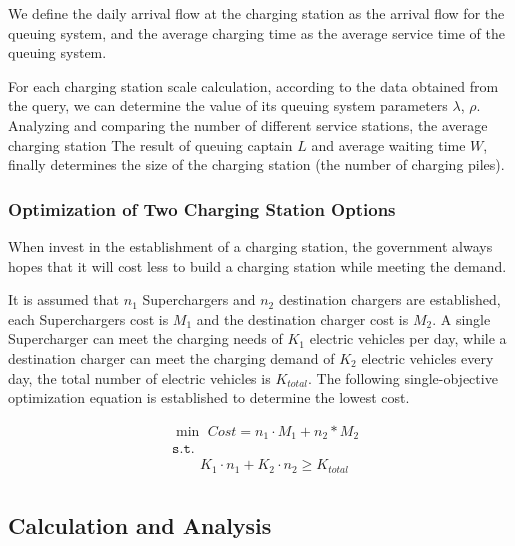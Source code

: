 \documentclass{mcmthesis}
\begin{document}
\par We define the daily arrival flow at the charging station as the arrival flow for the queuing system, and the average charging time as the average service time of the queuing system.

\par For each charging station scale calculation, according to the data obtained from the query, we can determine the value of its queuing system parameters $ \lambda $, $ \rho $. Analyzing and comparing the number of different service stations, the average charging station The result of queuing captain $ L $ and average waiting time $ W $, finally determines the size of the charging station (the number of charging piles).

\subsubsection{Optimization of Two Charging Station Options}


\par When invest in the establishment of a charging station, the government always hopes that it will cost less to build a charging station while meeting the demand. 

\par It is assumed that $n_1$ Superchargers and $n_2$ destination chargers are established, each Superchargers cost is $M_1$ and the destination charger cost is $M_2$. A single Supercharger can meet the charging needs of $K_1$ electric vehicles per day, while a destination charger can meet the charging demand of $K_2$ electric vehicles every day, the total number of electric vehicles is $K_{total}$. The following single-objective optimization equation is established to determine the lowest cost.

\begin{equation}
\begin{split}
&\min\,\,  Cost = n_1 \cdot M_1 + n_2 * M_2\\ 
& \texttt{s}.\texttt{t}.  \\
& \qquad K_1 \cdot n_1 + K_2 \cdot n_2 \geqslant K_{total} \\
\end{split}
\end{equation}


\subsection{Calculation and Analysis}
\end{document}
